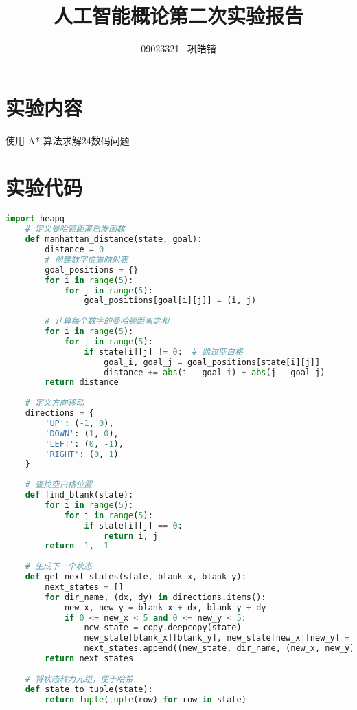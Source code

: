 \documentclass[a4paper,12pt]{article}
\title{人工智能概论第二次实验报告}
\author{09023321 \ 巩皓锴}
\begin{document}
\maketitle

\section{实验内容}
    使用 A* 算法求解24数码问题

\section{实验代码}

\begin{lstlisting}[language=Python, caption=A*算法代码示例]
    import heapq
    # 定义曼哈顿距离启发函数
    def manhattan_distance(state, goal):
        distance = 0
        # 创建数字位置映射表
        goal_positions = {}
        for i in range(5):
            for j in range(5):
                goal_positions[goal[i][j]] = (i, j)
        
        # 计算每个数字的曼哈顿距离之和
        for i in range(5):
            for j in range(5):
                if state[i][j] != 0:  # 跳过空白格
                    goal_i, goal_j = goal_positions[state[i][j]]
                    distance += abs(i - goal_i) + abs(j - goal_j)
        return distance
    
    # 定义方向移动
    directions = {
        'UP': (-1, 0),
        'DOWN': (1, 0),
        'LEFT': (0, -1),
        'RIGHT': (0, 1)
    }
    
    # 查找空白格位置
    def find_blank(state):
        for i in range(5):
            for j in range(5):
                if state[i][j] == 0:
                    return i, j
        return -1, -1
    
    # 生成下一个状态
    def get_next_states(state, blank_x, blank_y):
        next_states = []
        for dir_name, (dx, dy) in directions.items():
            new_x, new_y = blank_x + dx, blank_y + dy
            if 0 <= new_x < 5 and 0 <= new_y < 5:
                new_state = copy.deepcopy(state)
                new_state[blank_x][blank_y], new_state[new_x][new_y] = new_state[new_x][new_y], new_state[blank_x][blank_y]
                next_states.append((new_state, dir_name, (new_x, new_y)))
        return next_states
    
    # 将状态转为元组，便于哈希
    def state_to_tuple(state):
        return tuple(tuple(row) for row in state)
    

\end{lstlisting}
\end{document}
